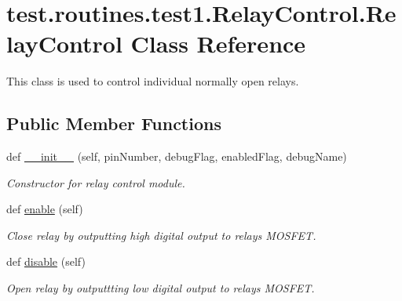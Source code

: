 \hypertarget{classtest_1_1routines_1_1test1_1_1RelayControl_1_1RelayControl}{}\section{test.\+routines.\+test1.\+Relay\+Control.\+Relay\+Control Class Reference}
\label{classtest_1_1routines_1_1test1_1_1RelayControl_1_1RelayControl}


This class is used to control individual normally open relays.  


\subsection*{Public Member Functions}
\begin{DoxyCompactItemize}
\item 
def \hyperlink{classtest_1_1routines_1_1test1_1_1RelayControl_1_1RelayControl_a502bc170880a9dee52a704a9727c4a30}{\+\_\+\+\_\+init\+\_\+\+\_\+} (self, pin\+Number, debug\+Flag, enabled\+Flag, debug\+Name)
\begin{DoxyCompactList}\small\item\em Constructor for relay control module. \end{DoxyCompactList}\item 
\mbox{\label{classtest_1_1routines_1_1test1_1_1RelayControl_1_1RelayControl_af26fe9dca7f7bc8195756a436d9a3cda}} 
def \hyperlink{classtest_1_1routines_1_1test1_1_1RelayControl_1_1RelayControl_af26fe9dca7f7bc8195756a436d9a3cda}{enable} (self)
\begin{DoxyCompactList}\small\item\em Close relay by outputting high digital output to relay\textquotesingle{}s M\+O\+S\+F\+ET. \end{DoxyCompactList}\item 
\mbox{\label{classtest_1_1routines_1_1test1_1_1RelayControl_1_1RelayControl_a95a6907035a9d00a2b7ee6d025adbfae}} 
def \hyperlink{classtest_1_1routines_1_1test1_1_1RelayControl_1_1RelayControl_a95a6907035a9d00a2b7ee6d025adbfae}{disable} (self)
\begin{DoxyCompactList}\small\item\em Open relay by outputtting low digital output to relay\textquotesingle{}s M\+O\+S\+F\+ET. \end{DoxyCompactList}\end{DoxyCompactItemize}
